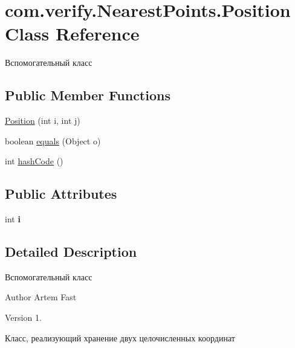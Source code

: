 \hypertarget{classcom_1_1verify_1_1_nearest_points_1_1_position}{}\section{com.\+verify.\+Nearest\+Points.\+Position Class Reference}
\label{classcom_1_1verify_1_1_nearest_points_1_1_position}


Вспомогательный класс  


\subsection*{Public Member Functions}
\begin{DoxyCompactItemize}
\item 
\mbox{\hyperlink{classcom_1_1verify_1_1_nearest_points_1_1_position_ad47c28b231b4e9fe4571edcbca75cc3e}{Position}} (int i, int j)
\item 
boolean \mbox{\hyperlink{classcom_1_1verify_1_1_nearest_points_1_1_position_ac235cd26f18c4854f3d305f919357791}{equals}} (Object o)
\item 
int \mbox{\hyperlink{classcom_1_1verify_1_1_nearest_points_1_1_position_a99056ef30aa80e484bcbae9f7b5061d1}{hash\+Code}} ()
\end{DoxyCompactItemize}
\subsection*{Public Attributes}
\begin{DoxyCompactItemize}
\item 
\mbox{\label{classcom_1_1verify_1_1_nearest_points_1_1_position_ac7530809fd70683a42dd0707a11d5562}} 
int {\bfseries i}
\end{DoxyCompactItemize}


\subsection{Detailed Description}
Вспомогательный класс 

\begin{DoxyAuthor}{Author}
Artem Fast 
\end{DoxyAuthor}
\begin{DoxyVersion}{Version}
1. 
\end{DoxyVersion}
Класс, реализующий хранение двух целочисленных координат 

